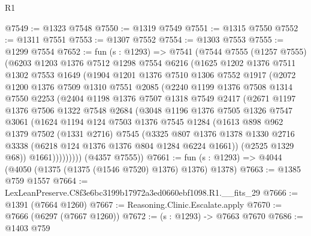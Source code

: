 \begin{lexlean}{R1}
\begin{coremodule}
@7549 := @1323 @7548
@7550 := @1319 @7549
@7551 := @1315 @7550
@7552 := @1311 @7551
@7553 := @1307 @7552
@7554 := @1303 @7553
@7555 := @1299 @7554
@7652 := fun (s : @1293) =>
  @7541
    (@7544
      @7555
      (@1257 @7555)
      (@6203
        @1203
        @1376
        @7512
        @1298
        @7554
        @6216
        (@1625
          @1202
          @1376
          @7511
          @1302
          @7553
          @1649
          (@1904
            @1201
            @1376
            @7510
            @1306
            @7552
            @1917
            (@2072
              @1200
              @1376
              @7509
              @1310
              @7551
              @2085
              (@2240
                @1199
                @1376
                @7508
                @1314
                @7550
                @2253
                (@2404
                  @1198
                  @1376
                  @7507
                  @1318
                  @7549
                  @2417
                  (@2671
                    @1197
                    @1376
                    @7506
                    @1322
                    @7548
                    @2684
                    (@3048
                      @1196
                      @1376
                      @7505
                      @1326
                      @7547
                      @3061
                      (@1624
                        @1194
                        @124
                        @7503
                        @1376
                        @7545
                        @1284
                        (@1613
                          @898
                          @962
                          @1379
                          @7502
                          (@1331 @2716)
                          @7545
                          (@3325
                            @807
                            @1376
                            @1378
                            @1330
                            @2716
                            @3338
                            (@6218 @124 @1376 @1376 @804 @1284 @6224 @1661))
                          (@2525 @1329 @68))
                        @1661)))))))))
      (@4357 @7555))
@7661 := fun (s : @1293) => @4044 (@4050 (@1375 (@1375 (@1546 @7520) @1376) @1376) @1378)
@7663 := @1385 @759 @1557
@7664 := LexLeanPreserve.C8f3e6bc3199b17972a3ed0660ebf1098.R1.__fits_29
@7666 := @1391 (@7664 @1260)
@7667 := Reasoning.Clinic.Escalate.apply
@7670 := @7666 (@6297 (@7667 @1260))
@7672 := (s : @1293) -> @7663 @7670
@7686 := @1403
    @759

\end{coremodule}
\end{lexlean}
